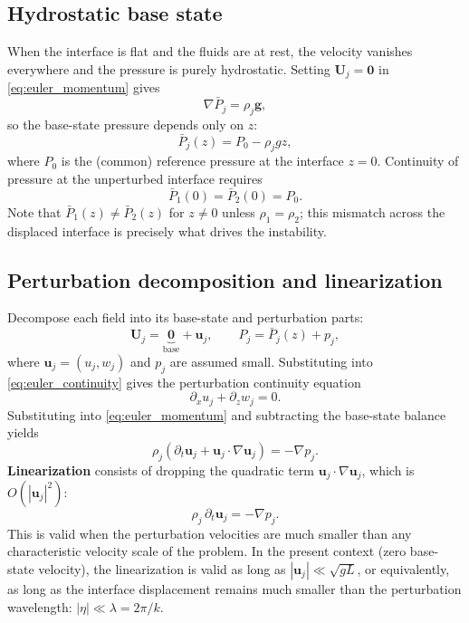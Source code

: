 \documentclass[11pt,a4paper]{article}
\begin{document}
\subsection{Hydrostatic base state}

When the interface is flat and the fluids are at rest, the velocity vanishes everywhere and the pressure is purely hydrostatic.  Setting $\bm{U}_j=\bm{0}$ in \eqref{eq:euler_momentum} gives
\begin{equation}
    \nabla \bar{P}_j = \rho_j \bm{g},
\end{equation}
so the base-state pressure depends only on $z$:
\begin{equation}
    \bar{P}_j(z) = P_0 - \rho_j g z,
    \label{eq:hydrostatic_pressure}
\end{equation}
where $P_0$ is the (common) reference pressure at the interface $z=0$.  Continuity of pressure at the unperturbed interface requires
\begin{equation}
    \bar{P}_1(0) = \bar{P}_2(0) = P_0.
\end{equation}
Note that $\bar{P}_1(z) \neq \bar{P}_2(z)$ for $z\neq 0$ unless $\rho_1=\rho_2$; this mismatch across the displaced interface is precisely what drives the instability.

\subsection{Perturbation decomposition and linearization}

Decompose each field into its base-state and perturbation parts:
\begin{equation}
    \bm{U}_j = \underbrace{\bm{0}}_{\text{base}} + \bm{u}_j,
    \qquad
    P_j = \bar{P}_j(z) + p_j,
\end{equation}
where $\bm{u}_j=(u_j,w_j)$ and $p_j$ are assumed small.  Substituting into \eqref{eq:euler_continuity} gives the perturbation continuity equation
\begin{equation}
    \partial_x u_j + \partial_z w_j = 0.
    \label{eq:perturbation_continuity}
\end{equation}
Substituting into \eqref{eq:euler_momentum} and subtracting the base-state balance yields
\begin{equation}
    \rho_j\left(\partial_t\bm{u}_j + \bm{u}_j\cdot\nabla\bm{u}_j\right)
    =
    -\nabla p_j.
    \label{eq:perturbation_momentum_nonlinear}
\end{equation}
\textbf{Linearization} consists of dropping the quadratic term $\bm{u}_j\cdot\nabla\bm{u}_j$, which is $O(|\bm{u}_j|^2)$:
\begin{equation}
    \boxed{
    \rho_j\,\partial_t\bm{u}_j
    =
    -\nabla p_j.
    }
    \label{eq:linearized_momentum}
\end{equation}
This is valid when the perturbation velocities are much smaller than any characteristic velocity scale of the problem.  In the present context (zero base-state velocity), the linearization is valid as long as $|\bm{u}_j| \ll \sqrt{gL}$, or equivalently, as long as the interface displacement remains much smaller than the perturbation wavelength: $|\eta| \ll \lambda = 2\pi/k$.
\end{document}

